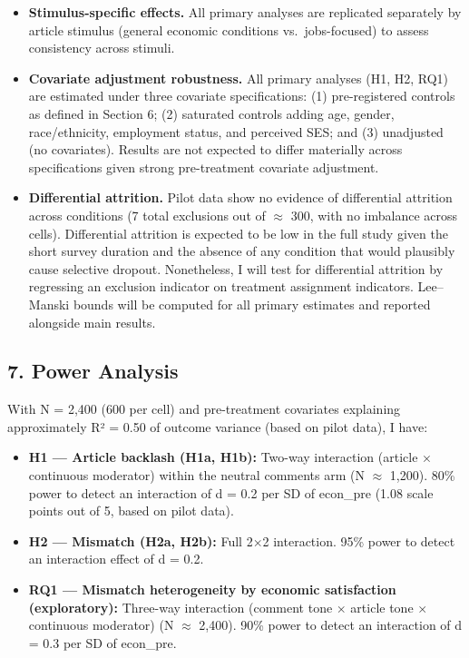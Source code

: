 \documentclass[
  12pt]{article}
\providecommand{\tightlist}{%
  \setlength{\itemsep}{0pt}\setlength{\parskip}{0pt}}
\begin{document}
\begin{itemize}
  on whether effects are driven by material circumstances versus
  perceived ones. If alternative moderators produce substantially
  different estimates from econ\_pre (correlation \textless{} 0.4),
  results for all moderators are reported and differences discussed.
\item
  \textbf{Stimulus-specific effects.} All primary analyses are
  replicated separately by article stimulus (general economic conditions
  vs.~jobs-focused) to assess consistency across stimuli.
\item
  \textbf{Covariate adjustment robustness.} All primary analyses (H1,
  H2, RQ1) are estimated under three covariate specifications: (1)
  pre-registered controls as defined in Section 6; (2) saturated
  controls adding age, gender, race/ethnicity, employment status, and
  perceived SES; and (3) unadjusted (no covariates). Results are not
  expected to differ materially across specifications given strong
  pre-treatment covariate adjustment.
\item
  \textbf{Differential attrition.} Pilot data show no evidence of
  differential attrition across conditions (7 total exclusions out of
  \(\approx\) 300, with no imbalance across cells). Differential
  attrition is expected to be low in the full study given the short
  survey duration and the absence of any condition that would plausibly
  cause selective dropout. Nonetheless, I will test for differential
  attrition by regressing an exclusion indicator on treatment assignment
  indicators. Lee--Manski bounds will be computed for all primary
  estimates and reported alongside main results.
\end{itemize}

\subsection{7. Power Analysis}\label{power-analysis}

With N = 2,400 (600 per cell) and pre-treatment covariates explaining
approximately R² = 0.50 of outcome variance (based on pilot data), I
have:

\begin{itemize}
\tightlist
\item
  \textbf{H1 --- Article backlash (H1a, H1b):} Two-way interaction
  (article \(\times\) continuous moderator) within the neutral comments
  arm (N \(\approx\) 1,200). 80\% power to detect an interaction of d =
  0.2 per SD of econ\_pre (1.08 scale points out of 5, based on pilot
  data).
\item
  \textbf{H2 --- Mismatch (H2a, H2b):} Full 2×2 interaction. 95\% power
  to detect an interaction effect of d = 0.2.
\item
  \textbf{RQ1 --- Mismatch heterogeneity by economic satisfaction
  (exploratory):} Three-way interaction (comment tone \(\times\) article
  tone \(\times\) continuous moderator) (N \(\approx\) 2,400). 90\%
  power to detect an interaction of d = 0.3 per SD of econ\_pre.
\end{itemize}
\end{document}
